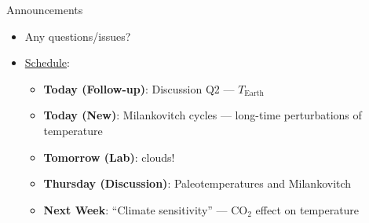 \documentclass[12pt]{beamer}
\title%
{}
\subtitle
{} %
\author%
{Ben Holder}%
\date%
{}
\begin{document}

\begin{frame}{Announcements}
	\begin{itemize}
	\addtolength{\itemsep}{0.5\baselineskip}
	\item Any questions/issues?
	\item \underline{Schedule}:
		\begin{itemize}
		\item[]{\bf Today (Follow-up)}: Discussion Q2 --- $T_\text{Earth}$
		\item[]{\bf Today (New)}: Milankovitch cycles --- long-time perturbations of temperature
		\item[]{\bf Tomorrow (Lab)}: clouds!
		\item[]{\bf Thursday (Discussion)}: Paleotemperatures and Milankovitch
		\item[] {\bf Next Week}: ``Climate sensitivity'' ---  $\text{CO}_2$ effect on temperature
		\end{itemize}
	\end{itemize}

\end{frame}
%
%
%	
%
%
%
%
%
%
%
%
%
\end{document}
